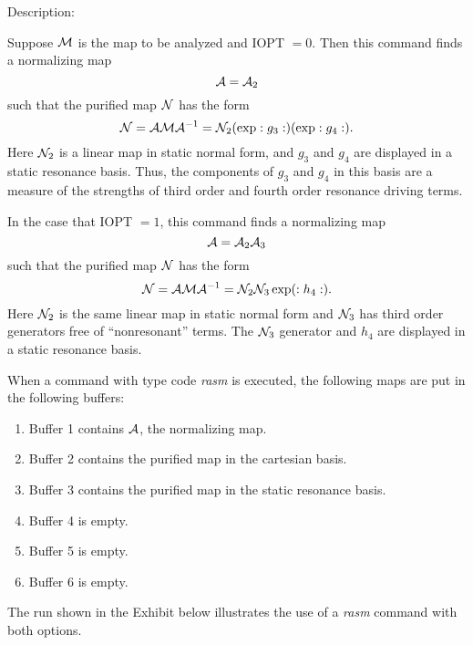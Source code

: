 \vspace{5mm}
     Description:
\vspace{2mm}

Suppose ${\cal M}$ is the map to be analyzed and IOPT $= 0$.  Then this command finds a normalizing map
\[
{\cal A} = {\cal A}_2
\]
such that the purified map ${\cal N}$ has the form
\[
{\cal N} = {\cal A} {\cal M} {\cal A}^{-1} = {\cal N}_2 (\exp :g_3:)(\exp :g_4:).
\]
Here ${\cal N}_2$ is a linear map in static normal form, and $g_3$ and $g_4$ are displayed in a static resonance basis.  Thus, the components of $g_3$ and $g_4$ in this basis are a measure of the strengths of third order and fourth order resonance driving terms.

In the case that IOPT $= 1$, this command finds a normalizing map
\[
{\cal A} = {\cal A}_2 {\cal A}_3
\]
such that the purified map ${\cal N}$ has the form
\[
{\cal N} = {\cal A} {\cal M} {\cal A}^{-1} = {\cal N}_2 {\cal N}_3 \exp (:h_4:).
\]
Here ${\cal N}_2$ is the same linear map in static normal form and ${\cal N}_3$ has third order generators free of ``nonresonant'' terms.  The ${\cal N}_3$ generator and $h_4$ are displayed in a static resonance basis.

     When a command with type code {\em rasm } is executed, the following maps
are put in the following buffers:
\begin{enumerate}
           \item  Buffer 1 contains ${\cal A}$, the normalizing map.

           \item  Buffer 2 contains the purified map in the cartesian basis.

           \item  Buffer 3 contains the purified map in the static resonance basis.

           \item  Buffer 4 is empty.

           \item  Buffer 5 is empty.

		   \item  Buffer 6 is empty.
\end{enumerate}

The \Mary run shown in the Exhibit below illustrates the use of a {\em rasm} command with both options.

